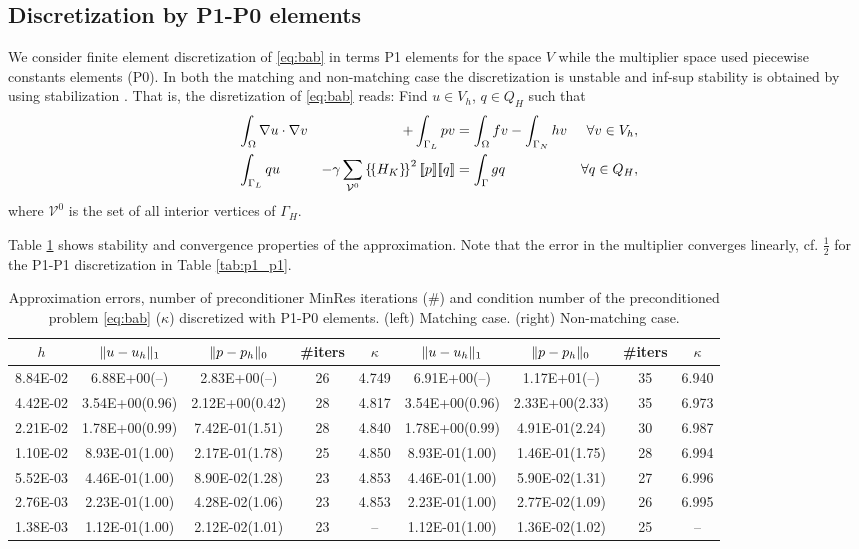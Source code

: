 \documentclass[r]{siamart171218}
\begin{document}
\subsection{Discretization by P1-P0 elements}\label{sec:p1_p0}
We consider finite element discretization of \eqref{eq:bab} in terms P1 elements
for the space $V$ while the multiplier space used piecewise constants elements
(P0). In both the matching and non-matching case the discretization is unstable
and inf-sup stability is obtained by using stabilization \cite{burman2014projection}.
That is, the disretization of \eqref{eq:bab} reads: Find $u\in V_h$, $q\in Q_H$ such that
\[
\begin{aligned}
&\int_{\Omega} \nabla u\cdot \nabla v &+ \int_{\Gamma_L}p v &= \int_{\Omega} f v - \int_{\Gamma_N}h v &\forall v\in V_h,\\
  &\int_{\Gamma_L}q u  &-\gamma \sum_{\mathcal{V}^0} \left\{\!\left\{H_K\right\}\!\right\}^2[\![p]\!][\![q]\!] &= \int_{\Gamma} g q &\forall q\in Q_H,
  \end{aligned}
\]
where $\mathcal{V}^0$ is the set of all interior vertices of $\Gamma_H$.

Table \ref{tab:p1_p0} shows stability and convergence properties of the approximation.
Note that the error in the multiplier converges linearly, cf. $\tfrac{1}{2}$ for
the P1-P1 discretization in Table \ref{tab:p1_p1}.

\begin{table}
  \begin{center}
    \footnotesize{
  \begin{tabular}{c|cc|c|c||cc|c|c}
    \hline
    $h$ & $\lVert{u-u_h}\rVert_1$ & $\lVert{p-p_h}\rVert_0$ & \#{iters} & $\kappa$
        & $\lVert{u-u_h}\rVert_1$ & $\lVert{p-p_h}\rVert_0$ & \#{iters} & $\kappa$ \\
    \hline
8.84E-02 & 6.88E+00(--)   & 2.83E+00(--)  & 26 & 4.749  & 6.91E+00(--)   & 1.17E+01(--)  & 35 & 6.940 \\
4.42E-02 & 3.54E+00(0.96) & 2.12E+00(0.42)& 28 & 4.817  & 3.54E+00(0.96) & 2.33E+00(2.33)& 35 & 6.973 \\
2.21E-02 & 1.78E+00(0.99) & 7.42E-01(1.51)& 28 & 4.840  & 1.78E+00(0.99) & 4.91E-01(2.24)& 30 & 6.987 \\
1.10E-02 & 8.93E-01(1.00) & 2.17E-01(1.78)& 25 & 4.850  & 8.93E-01(1.00) & 1.46E-01(1.75)& 28 & 6.994 \\
5.52E-03 & 4.46E-01(1.00) & 8.90E-02(1.28)& 23 & 4.853  & 4.46E-01(1.00) & 5.90E-02(1.31)& 27 & 6.996 \\
2.76E-03 & 2.23E-01(1.00) & 4.28E-02(1.06)& 23 & 4.853  & 2.23E-01(1.00) & 2.77E-02(1.09)& 26 & 6.995 \\
1.38E-03 & 1.12E-01(1.00) & 2.12E-02(1.01)& 23 & --     & 1.12E-01(1.00) & 1.36E-02(1.02)& 25 & --    \\  
    \hline
  \end{tabular}
    }
    \caption{Approximation errors, number of preconditioner MinRes iterations (\#) and
      condition number of the preconditioned problem \eqref{eq:bab} ($\kappa$) discretized
      with P1-P0 elements. (left) Matching case. (right) Non-matching case.}
  \label{tab:p1_p0}
  \end{center}
\end{table}
\end{document}
